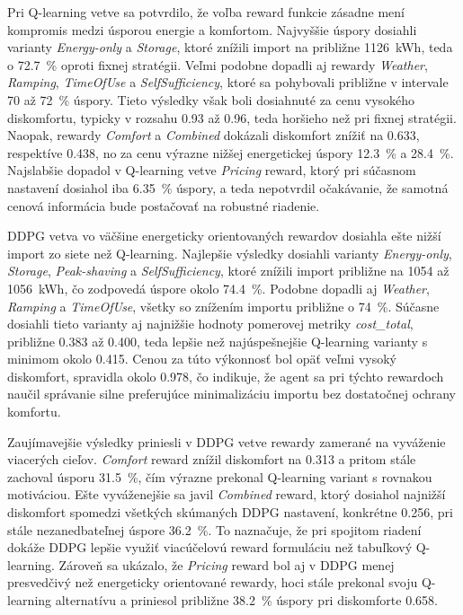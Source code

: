 \documentclass[conference]{IEEEtran}
\begin{document}
Pri Q-learning vetve sa potvrdilo, že voľba reward funkcie zásadne mení kompromis medzi úsporou energie a komfortom. Najvyššie úspory dosiahli varianty \textit{Energy-only} a \textit{Storage}, ktoré znížili import na približne 1126~kWh, teda o 72.7~\% oproti fixnej stratégii. Veľmi podobne dopadli aj rewardy \textit{Weather}, \textit{Ramping}, \textit{TimeOfUse} a \textit{SelfSufficiency}, ktoré sa pohybovali približne v intervale 70 až 72~\% úspory. Tieto výsledky však boli dosiahnuté za cenu vysokého diskomfortu, typicky v rozsahu 0.93 až 0.96, teda horšieho než pri fixnej stratégii. Naopak, rewardy \textit{Comfort} a \textit{Combined} dokázali diskomfort znížiť na 0.633, respektíve 0.438, no za cenu výrazne nižšej energetickej úspory 12.3~\% a 28.4~\%. Najslabšie dopadol v Q-learning vetve \textit{Pricing} reward, ktorý pri súčasnom nastavení dosiahol iba 6.35~\% úspory, a teda nepotvrdil očakávanie, že samotná cenová informácia bude postačovať na robustné riadenie.

DDPG vetva vo väčšine energeticky orientovaných rewardov dosiahla ešte nižší import zo siete než Q-learning. Najlepšie výsledky dosiahli varianty \textit{Energy-only}, \textit{Storage}, \textit{Peak-shaving} a \textit{SelfSufficiency}, ktoré znížili import približne na 1054 až 1056~kWh, čo zodpovedá úspore okolo 74.4~\%. Podobne dopadli aj \textit{Weather}, \textit{Ramping} a \textit{TimeOfUse}, všetky so znížením importu približne o 74~\%. Súčasne dosiahli tieto varianty aj najnižšie hodnoty pomerovej metriky \textit{cost\_total}, približne 0.383 až 0.400, teda lepšie než najúspešnejšie Q-learning varianty s minimom okolo 0.415. Cenou za túto výkonnosť bol opäť veľmi vysoký diskomfort, spravidla okolo 0.978, čo indikuje, že agent sa pri týchto rewardoch naučil správanie silne preferujúce minimalizáciu importu bez dostatočnej ochrany komfortu.

Zaujímavejšie výsledky priniesli v DDPG vetve rewardy zamerané na vyváženie viacerých cieľov. \textit{Comfort} reward znížil diskomfort na 0.313 a pritom stále zachoval úsporu 31.5~\%, čím výrazne prekonal Q-learning variant s rovnakou motiváciou. Ešte vyváženejšie sa javil \textit{Combined} reward, ktorý dosiahol najnižší diskomfort spomedzi všetkých skúmaných DDPG nastavení, konkrétne 0.256, pri stále nezanedbateľnej úspore 36.2~\%. To naznačuje, že pri spojitom riadení dokáže DDPG lepšie využiť viacúčelovú reward formuláciu než tabuľkový Q-learning. Zároveň sa ukázalo, že \textit{Pricing} reward bol aj v DDPG menej presvedčivý než energeticky orientované rewardy, hoci stále prekonal svoju Q-learning alternatívu a priniesol približne 38.2~\% úspory pri diskomforte 0.658.
\end{document}
